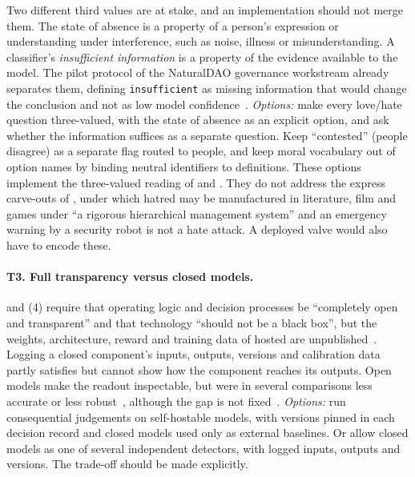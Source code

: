 Two different third values are at stake, and an implementation should not merge them.
The state of absence is a property of a person's expression or understanding under interference, such as noise, illness or misunderstanding. A classifier's \emph{insufficient information} is a property of the evidence available to the model.
The pilot protocol of the NaturalDAO governance workstream already separates them, defining \texttt{insufficient} as missing information that would change the conclusion and not as low model confidence~\cite{polgov}.
\emph{Options:} make every love/hate question three-valued, with the state of absence as an explicit option, and ask whether the information suffices as a separate question.
Keep ``contested'' (people disagree) as a separate flag routed to people, and keep moral vocabulary out of option names by binding neutral identifiers to definitions.
These options implement the three-valued reading of  and .
They do not address the express carve-outs of , under which hatred may be manufactured in literature, film and games under ``a rigorous hierarchical management system'' and an emergency warning by a security robot is not a hate attack. A deployed valve would also have to encode these.

\paragraph{T3. Full transparency versus closed models.}
 and (4) require that operating logic and decision processes be ``completely open and transparent'' and that technology ``should not be a black box'', but the weights, architecture, reward and training data of hosted \jev{} are unpublished~\cite{arx24574,arx28919}.
Logging a closed component's inputs, outputs, versions and calibration data partly satisfies  but cannot show how the component reaches its outputs.
Open models make the readout inspectable, but were in several comparisons less accurate or less robust~\cite{arx26758,arx33401}, although the gap is not fixed~\cite{arx00346,arx36965}.
\emph{Options:} run consequential judgements on self-hostable models, with versions pinned in each decision record and closed models used only as external baselines.
Or allow closed models as one of several independent detectors, with logged inputs, outputs and versions.
The trade-off should be made explicitly.

